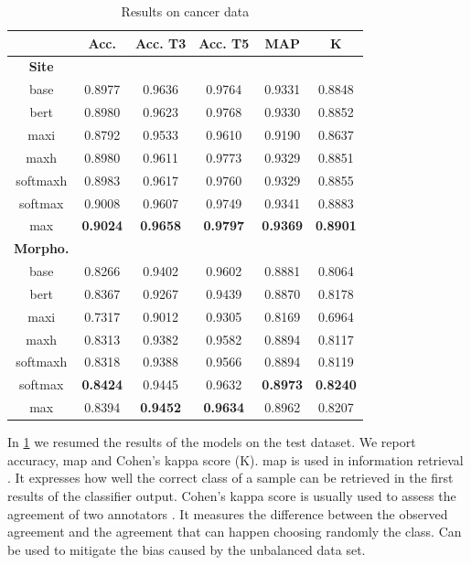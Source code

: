 \begin{table}
  \centering
  \caption{Results on cancer data}
  \label{tab:results}
  \begin{tabular}{|c|c|c|c|c|c|}
    \hline
    &Acc.&Acc. T3&Acc. T5&MAP&K\\
    \hline
    \hline
    \textbf{Site}&&&&&\\
    base&0.8977&0.9636&0.9764&0.9331&0.8848\\
    \acs{bert}&0.8980&0.9623&0.9768&0.9330&0.8852\\
    \acs{maxi}&0.8792&0.9533&0.9610&0.9190&0.8637\\
    \acs{maxh}&0.8980&0.9611&0.9773&0.9329&0.8851\\
    \acs{softmaxh}&0.8983&0.9617&0.9760&0.9329&0.8855\\
    \acs{softmax}&0.9008&0.9607&0.9749&0.9341&0.8883\\
    \acs{max}&\textbf{0.9024}&\textbf{0.9658}&\textbf{0.9797}&\textbf{0.9369}&\textbf{0.8901}\\
    \hline
    \hline
    \textbf{Morpho.}&&&&&\\
    base&0.8266&0.9402&0.9602&0.8881&0.8064\\
    \acs{bert}&0.8367&0.9267&0.9439&0.8870&0.8178\\
    \acs{maxi}&0.7317&0.9012&0.9305&0.8169&0.6964\\
    \acs{maxh}&0.8313&0.9382&0.9582&0.8894&0.8117\\
    \acs{softmaxh}&0.8318&0.9388&0.9566&0.8894&0.8119\\
    \acs{softmax}&\textbf{0.8424}&0.9445&0.9632&\textbf{0.8973}&\textbf{0.8240}\\
    \acs{max}&0.8394&\textbf{0.9452}&\textbf{0.9634}&0.8962&0.8207\\
    \hline
  \end{tabular}
\end{table}
In \cref{tab:results} we resumed the results of the models on the test
dataset. We report accuracy, \ac{map} and Cohen's kappa score (K).
\ac{map} is used in information
retrieval \cite{manning_introduction_2008}. It expresses how well the
correct class of a sample can be retrieved in 
the first results of the classifier output.
Cohen's kappa score is usually used to assess
the agreement of two annotators \cite{cohen_coefficient_1960}. It
measures the difference between the observed agreement and the
agreement that can happen choosing randomly the class. Can be used to
mitigate the bias caused by the unbalanced data set.

